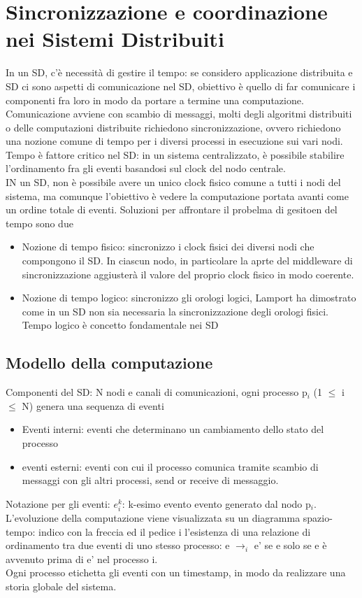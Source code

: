 \documentclass{article}
\begin{document}
\section{Sincronizzazione e coordinazione nei Sistemi Distribuiti}
In un SD, c'è necessità di gestire il tempo: se considero applicazione distribuita e SD ci sono aspetti di comunicazione nel SD, obiettivo è quello di far comunicare i componenti fra loro in modo da portare a termine una computazione. Comunicazione avviene con scambio di messaggi, molti degli algoritmi distribuiti o delle computazioni distribuite richiedono sincronizzazione, ovvero richiedono una nozione comune di tempo per i diversi processi in esecuzione sui vari nodi. Tempo è fattore critico nel SD: in un sistema centralizzato, è possibile stabilire l'ordinamento fra gli eventi basandosi sul clock del nodo centrale.\\ IN un SD, non è possibile avere un unico clock fisico comune a tutti i nodi del sistema, ma comunque l'obiettivo è vedere la computazione portata avanti come un ordine totale di eventi. Soluzioni per affrontare il probelma di gesitoen del tempo sono due
\begin{itemize}
\item Nozione di tempo fisico: sincronizzo i clock fisici dei diversi nodi che compongono il SD. In ciascun nodo, in particolare la aprte del middleware di sincronizzazione aggiusterà il valore del proprio clock fisico in modo coerente.
\item Nozione di tempo logico: sincronizzo gli orologi logici, Lamport ha dimostrato come in un SD non sia necessaria la sincronizzazione degli orologi fisici. Tempo logico è concetto fondamentale nei SD
\end{itemize}
\subsection{Modello della computazione}
Componenti del SD: N nodi e canali di comunicazioni, ogni processo p$_i$ (1 $\leq$ i $\leq$ N) genera una sequenza di eventi
\begin{itemize}
\item Eventi interni: eventi che determinano un cambiamento dello stato del processo
\item eventi esterni: eventi con cui il processo comunica tramite scambio di messaggi con gli altri processi, send or receive di messaggio.
\end{itemize}
Notazione per gli eventi: $e_{i}^k$: k-esimo evento evento generato dal nodo p$_i$. L'evoluzione della computazione viene visualizzata su un diagramma spazio-tempo: indico con la freccia ed il pedice i l'esistenza di una relazione di ordinamento tra due eventi di uno stesso processo: e $\rightarrow_i$ e' se e solo se e è avvenuto prima di e' nel processo i.\\ Ogni processo etichetta gli eventi con un timestamp, in modo da realizzare una storia globale del sistema.
\end{document}
